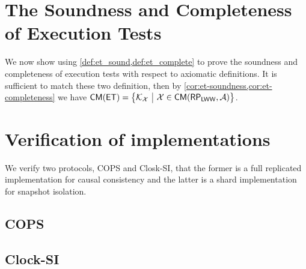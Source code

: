 \documentclass[conference,compsoc]{IEEEtran}
\newcommand{\RootPath}{.}
\begin{document}
\section{The Soundness and Completeness of Execution Tests}
\label{app:et_sound_complete}
We now show using \cref{def:et_sound,def:et_complete} to prove the soundness and completeness of execution tests with respect to axiomatic definitions.
It is sufficient to match these two definition, 
then by \cref{cor:et-soundness,cor:et-completeness} we have \( \CMs(\ET) = \Setcon{\mkvs_\aexec}{\aexec \in \CMa(\RP_\LWW,\Ax)} \).
\label{sec:kv-sound-complete-proof}
\label{sec:spec-proof}











\section{Verification of implementations}
We verify two protocols, COPS and Closk-SI, that the former is a full replicated implementation for causal consistency and the latter is a shard implementation for snapshot isolation.
\subsection{COPS}
\label{sec:cops}


\subsection{Clock-SI}
\label{sec:clock-si}


\end{document}
